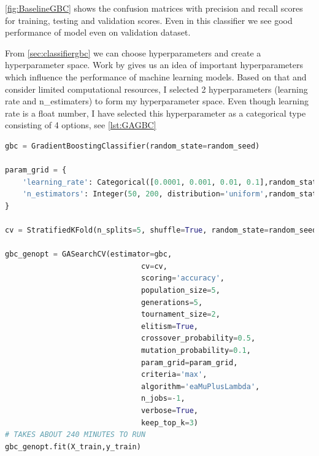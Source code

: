 \autoref{fig:BaselineGBC} shows the confusion matrices with precision and recall scores for training, testing and validation scores. Even in this classifier we see good performance of model even on validation dataset.

From \autoref{sec:classifiergbc} we can choose hyperparameters and create a hyperparameter space. Work by \cite{Clarke2020} gives us an idea of important hyperparameters which influence the performance of machine learning models. Based on that and consider limited computational resources, I selected 2 hyperparameters (learning rate and n\_estimaters) to form my hyperparameter space. Even though learning rate is a float number, I have selected this hyperparameter as a categorical type consisting of 4 options, see \autoref{lst:GAGBC}

\begin{lstlisting}[language=Python, caption={Applying genetic algorithm to Gradient Boosting Classifer}, label={lst:GAGBC}]
gbc = GradientBoostingClassifier(random_state=random_seed)

param_grid = {
    'learning_rate': Categorical([0.0001, 0.001, 0.01, 0.1],random_state=random_seed),
    'n_estimators': Integer(50, 200, distribution='uniform',random_state=random_seed)
}

cv = StratifiedKFold(n_splits=5, shuffle=True, random_state=random_seed)

gbc_genopt = GASearchCV(estimator=gbc,
                               cv=cv,
                               scoring='accuracy',
                               population_size=5,
                               generations=5,
                               tournament_size=2,
                               elitism=True,
                               crossover_probability=0.5,
                               mutation_probability=0.1,
                               param_grid=param_grid,
                               criteria='max',
                               algorithm='eaMuPlusLambda',
                               n_jobs=-1,
                               verbose=True,
                               keep_top_k=3)
# TAKES ABOUT 240 MINUTES TO RUN
gbc_genopt.fit(X_train,y_train)
\end{lstlisting}

